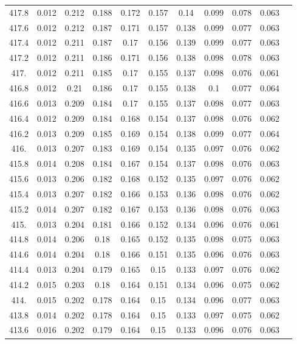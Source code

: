 \documentclass[12pt]{ctexart}
\numberwithin{equation}{section}
\begin{document}
\begin{longtable}{ccccccccccc}
417.8	&	0.012	&	0.212	&	0.188	&	0.172	&	0.157	&	0.14	&	0.099	&	0.078	&	0.063	\\
417.6	&	0.012	&	0.212	&	0.187	&	0.171	&	0.157	&	0.138	&	0.099	&	0.077	&	0.063	\\
417.4	&	0.012	&	0.211	&	0.187	&	0.17	&	0.156	&	0.139	&	0.099	&	0.077	&	0.063	\\
417.2	&	0.012	&	0.211	&	0.186	&	0.171	&	0.156	&	0.138	&	0.098	&	0.078	&	0.063	\\
417.	&	0.012	&	0.211	&	0.185	&	0.17	&	0.155	&	0.137	&	0.098	&	0.076	&	0.061	\\
416.8	&	0.012	&	0.21	&	0.186	&	0.17	&	0.155	&	0.138	&	0.1	&	0.077	&	0.064	\\
416.6	&	0.013	&	0.209	&	0.184	&	0.17	&	0.155	&	0.137	&	0.098	&	0.077	&	0.063	\\
416.4	&	0.012	&	0.209	&	0.184	&	0.168	&	0.154	&	0.137	&	0.098	&	0.076	&	0.062	\\
416.2	&	0.013	&	0.209	&	0.185	&	0.169	&	0.154	&	0.138	&	0.099	&	0.077	&	0.064	\\
416.	&	0.013	&	0.207	&	0.183	&	0.169	&	0.154	&	0.135	&	0.097	&	0.076	&	0.062	\\
415.8	&	0.014	&	0.208	&	0.184	&	0.167	&	0.154	&	0.137	&	0.098	&	0.076	&	0.063	\\
415.6	&	0.013	&	0.206	&	0.182	&	0.168	&	0.152	&	0.135	&	0.097	&	0.076	&	0.062	\\
415.4	&	0.013	&	0.207	&	0.182	&	0.166	&	0.153	&	0.136	&	0.098	&	0.076	&	0.062	\\
415.2	&	0.014	&	0.207	&	0.182	&	0.167	&	0.153	&	0.136	&	0.098	&	0.076	&	0.063	\\
415.	&	0.013	&	0.204	&	0.181	&	0.166	&	0.152	&	0.134	&	0.096	&	0.076	&	0.061	\\
414.8	&	0.014	&	0.206	&	0.18	&	0.165	&	0.152	&	0.135	&	0.098	&	0.075	&	0.063	\\
414.6	&	0.014	&	0.204	&	0.18	&	0.166	&	0.151	&	0.135	&	0.096	&	0.076	&	0.063	\\
414.4	&	0.013	&	0.204	&	0.179	&	0.165	&	0.15	&	0.133	&	0.097	&	0.076	&	0.062	\\
414.2	&	0.015	&	0.203	&	0.18	&	0.164	&	0.151	&	0.134	&	0.096	&	0.075	&	0.062	\\
414.	&	0.015	&	0.202	&	0.178	&	0.164	&	0.15	&	0.134	&	0.096	&	0.077	&	0.063	\\
413.8	&	0.014	&	0.202	&	0.178	&	0.164	&	0.15	&	0.133	&	0.097	&	0.075	&	0.062	\\
413.6	&	0.016	&	0.202	&	0.179	&	0.164	&	0.15	&	0.133	&	0.096	&	0.076	&	0.063	\\

\end{longtable}
\end{document}
